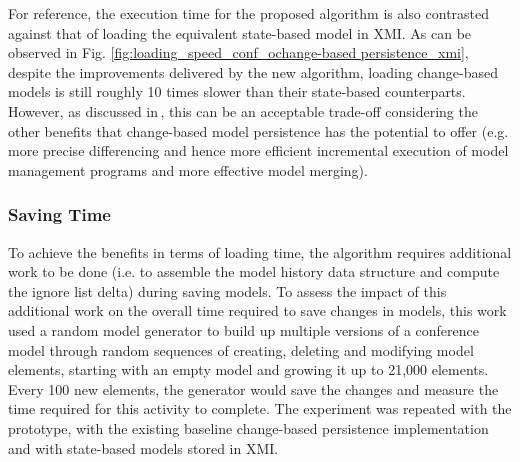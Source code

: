 \documentclass[12pt, a4paper]{report} \usepackage[titletoc]{appendix}
\begin{document}
For reference, the execution time for the proposed algorithm is also contrasted against that of loading the equivalent state-based model in XMI. As can be observed in Fig. \ref{fig:loading_speed_conf_ochange-based persistence_xmi}, despite the improvements delivered by the new algorithm, loading change-based models is still roughly 10 times slower than their state-based counterparts. However, as discussed in\,\cite{yohannis2017turning}, this can be an acceptable trade-off considering the other benefits that change-based model persistence has the potential to offer (e.g. more precise differencing and hence more efficient incremental execution of model management programs and more effective model merging).

\subsubsection{Saving Time}
\label{subsec:saving_time_test}

To achieve the benefits in terms of loading time, the algorithm requires additional work to be done (i.e. to assemble the model history data structure and compute the ignore list delta) during saving models. To assess the impact of this additional work on the overall time required to save changes in models, this work used a random model generator to build up multiple versions of a conference model through random sequences of creating, deleting and modifying model elements, starting with an empty model and growing it up to 21,000 elements. Every 100 new elements, the generator would save the changes and measure the time required for this activity to complete. The experiment was repeated with the prototype, with the existing baseline change-based persistence implementation and with state-based models stored in XMI.
\end{document}

